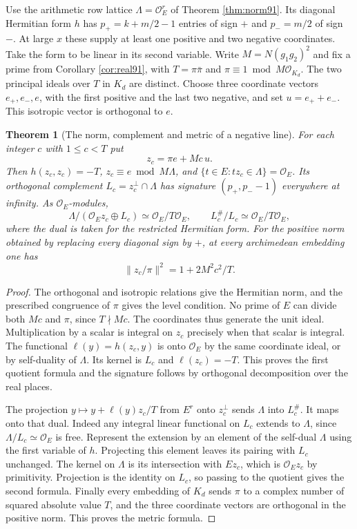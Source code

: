 \documentclass[a4paper,11pt]{article}
\newtheorem{theorem}[proposition]{Theorem}
\theoremstyle{definition}
\theoremstyle{remark}
\numberwithin{equation}{section}
\newcommand{\OO}{\mathcal O}
\begin{document}
Use the arithmetic row lattice \(\Lambda=\OO_E^r\) of
Theorem \ref{thm:norm91}.
Its diagonal Hermitian form \(h\) has \(p_+=k+m/2-1\) entries
of sign \(+\) and \(p_-=m/2\) of sign \(-\). At large \(x\)
these supply at least one positive and two negative coordinates.
Take the form to be linear in its second variable. Write
\(M=N(g_1g_2)^2\) and fix a prime from Corollary \ref{cor:real91},
with \(T=\pi\bar\pi\) and \(\pi\equiv1\bmod M\OO_{K_d}\).
The two principal ideals over \(T\) in \(K_d\) are distinct.
Choose three coordinate vectors \(e_+,e_-,e\), with the first
positive and the last two negative, and set \(u=e_++e_-\).
This isotropic vector is orthogonal to \(e\).

\begin{theorem}[The norm, complement and metric of a negative line]
\label{thm:line92}
For each integer \(c\) with \(1\le c<T\) put
\[
                    z_c=\pi e+Mc\,u .
\]
Then \(h(z_c,z_c)=-T\), \(z_c\equiv e\bmod M\Lambda\), and
\(\{t\in E:t z_c\in\Lambda\}=\OO_E\). Its orthogonal
complement \(L_c=z_c^\perp\cap\Lambda\) has signature
\((p_+,p_--1)\) everywhere at infinity. As \(\OO_E\)-modules,
\[
 \Lambda/(\OO_E z_c\oplus L_c)\simeq\OO_E/T\OO_E,
 \qquad L_c^\#/L_c\simeq\OO_E/T\OO_E ,
\]
where the dual is taken for the restricted Hermitian form.
For the positive norm obtained by replacing every diagonal
sign by \(+\), at every archimedean embedding one has
\[
          \|z_c/\pi\|^2=1+2M^2c^2/T .
\]
\end{theorem}
\begin{proof}
The orthogonal and isotropic relations give the Hermitian norm,
and the prescribed congruence of \(\pi\) gives the level
condition. No prime of \(E\) can divide both \(Mc\) and \(\pi\),
since \(T\nmid Mc\). The coordinates thus generate the unit
ideal. Multiplication by a scalar is integral on \(z_c\) precisely
when that scalar is integral. The functional
\(\ell(y)=h(z_c,y)\) is onto \(\OO_E\) by the same coordinate
ideal, or by self-duality of \(\Lambda\). Its kernel is \(L_c\)
and \(\ell(z_c)=-T\). This proves the first quotient formula
and the signature follows by orthogonal decomposition over
the real places.

The projection \(y\mapsto y+\ell(y)z_c/T\) from \(E^r\) onto
\(z_c^\perp\) sends \(\Lambda\) into \(L_c^\#\). It maps onto
that dual. Indeed any integral linear functional on \(L_c\)
extends to \(\Lambda\), since \(\Lambda/L_c\simeq\OO_E\)
is free. Represent the extension by an element of the self-dual
\(\Lambda\) using the first variable of \(h\). Projecting this
element leaves its pairing with \(L_c\) unchanged. The kernel
on \(\Lambda\) is its intersection with \(E z_c\), which is
\(\OO_Ez_c\) by primitivity. Projection is the identity on
\(L_c\), so passing to the quotient gives the second formula.
Finally every embedding of \(K_d\) sends \(\pi\) to a complex
number of squared absolute value \(T\), and the three coordinate
vectors are orthogonal in the positive norm. This proves the
metric formula.
\end{proof}
\end{document}
